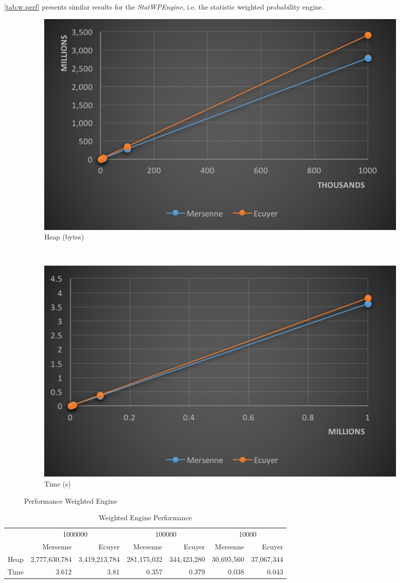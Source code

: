 \documentclass[12pt,a4paper,article]{memoir} %
\begin{document}
\autoref{tab:w.perf} presents similar results for the \emph{StatWPEngine}, 
i.e. the statistic weighted probability engine.
\begin{figure}[h!]
\centering
    \begin{subfigure}[b]{0.47\textwidth}
        \includegraphics[width=\textwidth]{img/perf-heap-w.png}
        \caption{Heap (bytes)}
    \end{subfigure}
    ~ 
    \begin{subfigure}[b]{0.47\textwidth}
        \includegraphics[width=\textwidth]{img/perf-time-w.png}
        \caption{Time (s)}
    \end{subfigure}
\caption{Performance Weighted Engine}
\label{fig:perf.w}
\end{figure}
\begin{table}[htbp!]
  \centering \tiny
    \begin{tabular}{r|rrrrrr}
    \multicolumn{1}{r}{} & \multicolumn{2}{c}{1000000} & \multicolumn{2}{c}{100000} & \multicolumn{2}{c}{10000} \\
    \multicolumn{1}{r}{} & Mersenne & Ecuyer & Mersenne & Ecuyer & Mersenne & Ecuyer \\
\cmidrule{2-7}    Heap  & 2,777,630,784 & 3,419,213,784 & 281,175,032 & 344,423,280 & 30,695,560 & 37,067,344 \\
    Time  & 3.612 & 3.81  & 0.357 & 0.379 & 0.038 & 0.043 \\
    \end{tabular}%
  \caption{Weighted Engine Performance}
  \label{tab:w.perf}%
\end{table}%
\end{document}
